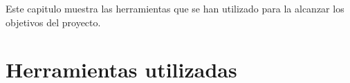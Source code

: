 
Este capitulo muestra las herramientas que se han utilizado para la alcanzar los objetivos del proyecto.
\section{Herramientas utilizadas}


